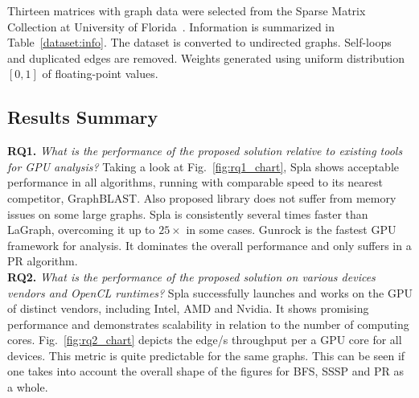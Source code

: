 Thirteen matrices with graph data were selected from the Sparse Matrix Collection at University of Florida~\cite{dataset:10.1145/2049662.2049663}. 
Information is summarized in Table~\ref{dataset:info}. 
The dataset is converted to undirected graphs. 
Self-loops and duplicated edges are removed. 
Weights generated using uniform distribution $[0, 1]$ of floating-point values.

\subsection{Results Summary}

\textbf{RQ1.} \textit{What is the performance of the proposed solution relative to existing tools for GPU analysis?} Taking a look at Fig.~\ref{fig:rq1_chart}, Spla shows acceptable performance in all algorithms, running with comparable speed to its nearest competitor, GraphBLAST. Also proposed library does not suffer from memory issues on some large graphs. Spla is consistently several times faster than LaGraph, overcoming it up to $25\times$ in some cases. Gunrock is the fastest GPU framework for analysis. It dominates the overall performance and only suffers in a PR algorithm.\\

\textbf{RQ2.} \textit{What is the performance of the proposed solution on various devices vendors and OpenCL runtimes?} Spla successfully launches and works on the GPU of distinct vendors, including Intel, AMD and Nvidia. It shows promising performance and demonstrates scalability in relation to the number of computing cores. Fig.~\ref{fig:rq2_chart} depicts the edge/s throughput per a GPU core for all devices. This metric is quite predictable for the same graphs. This can be seen if one takes into account the overall shape of the figures for BFS, SSSP and PR as a whole.